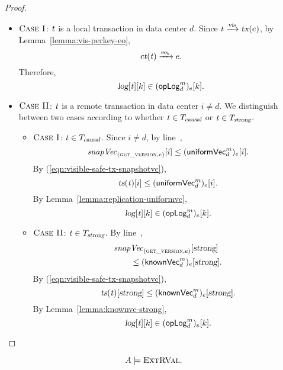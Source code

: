 \begin{proof}
  \begin{itemize}
    \item $\textsc{Case I}$: $\mathit{t}$ is a local transaction in data center $d$.
      Since $\mathit{t} \xrightarrow{\textsl{vis}} \textsl{tx}(e)$,
      by Lemma~\ref{lemma:vis-perkey-eo},
      \[
        \textsl{ct}(\mathit{t}) \xrightarrow{\textsl{eo}_{k}} e.
      \]
      Therefore,
      \[
        \textsl{log}[\mathit{t}][k] \in ({\sf opLog}^{m}_{d})_{e}[k].
      \]
    \item $\textsc{Case II}$: $\mathit{t}$ is a remote transaction
      in data center $i \neq d$.
      We distinguish between two cases
      according to whether $\mathit{t} \in T_{\textsl{causal}}$ or $\mathit{t} \in T_{\textsl{strong}}$.
      \begin{itemize}
        \item $\textsc{Case I}$: $\mathit{t} \in T_{\textsl{causal}}$.
          Since $i \neq d$,
          by line~\code{\ref{alg:unistore-replica}}{\ref{line:readkey-uniformvc}},
          \[
            \mathit{snapVec}_{(\textsc{get\_version}, e)}[i] \le ({\sf uniformVec}^{m}_{d})_{e}[i].
          \]
          By (\ref{eqn:visible-safe-tx-snapshotvc}),
          \[
            \textsl{ts}(\mathit{t})[i] \le ({\sf uniformVec}^{m}_{d})_{e}[i].
          \]
          By Lemma~\ref{lemma:replication-uniformvc},
          \[
            \textsl{log}[\mathit{t}][k] \in ({\sf opLog}^{m}_{d})_{e}[k].
          \]
        \item $\textsc{Case II}$: $\mathit{t} \in T_{\textsl{strong}}$.
          By line~\code{\ref{alg:unistore-replica}}{\ref{line:readkey-wait-util-knownvc}},
          \begin{align*}
            &\mathit{snapVec}_{(\textsc{get\_version}, e)}[\textsl{strong}] \\
              &\qquad \le ({\sf knownVec}^{m}_{d})_{e}[\textsl{strong}].
          \end{align*}
          By (\ref{eqn:visible-safe-tx-snapshotvc}),
          \[
            \textsl{ts}(\mathit{t})[\textsl{strong}] \le ({\sf knownVec}^{m}_{d})_{e}[\textsl{strong}].
          \]
          By Lemma~\ref{lemma:knownvc-strong},
          \[
            \textsl{log}[\mathit{t}][k] \in ({\sf opLog}^{m}_{d})_{e}[k].
          \]
      \end{itemize}
  \end{itemize}
\end{proof}

\begin{apptheorem} \label{thm:extretval}
  \[
    A \models \textsc{ExtRVal}.
  \]
\end{apptheorem}

